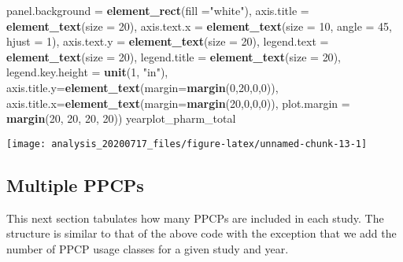 \documentclass[
]{article}
\newenvironment{Shaded}{\begin{snugshade}}{\end{snugshade}}
\newcommand{\DataTypeTok}[1]{\textcolor[rgb]{0.13,0.29,0.53}{#1}}
\newcommand{\DecValTok}[1]{\textcolor[rgb]{0.00,0.00,0.81}{#1}}
\newcommand{\KeywordTok}[1]{\textcolor[rgb]{0.13,0.29,0.53}{\textbf{#1}}}
\newcommand{\NormalTok}[1]{#1}
\newcommand{\StringTok}[1]{\textcolor[rgb]{0.31,0.60,0.02}{#1}}
\begin{document}
\begin{Shaded}
\begin{Highlighting}[]
        \DataTypeTok{panel.background =} \KeywordTok{element_rect}\NormalTok{(}\DataTypeTok{fill =}\StringTok{"white"}\NormalTok{),}
        \DataTypeTok{axis.title =} \KeywordTok{element_text}\NormalTok{(}\DataTypeTok{size =} \DecValTok{20}\NormalTok{),}
        \DataTypeTok{axis.text.x =} \KeywordTok{element_text}\NormalTok{(}\DataTypeTok{size =} \DecValTok{10}\NormalTok{, }\DataTypeTok{angle =} \DecValTok{45}\NormalTok{, }\DataTypeTok{hjust =} \DecValTok{1}\NormalTok{),}
        \DataTypeTok{axis.text.y =} \KeywordTok{element_text}\NormalTok{(}\DataTypeTok{size =} \DecValTok{20}\NormalTok{),}
        \DataTypeTok{legend.text =} \KeywordTok{element_text}\NormalTok{(}\DataTypeTok{size =} \DecValTok{20}\NormalTok{),}
        \DataTypeTok{legend.title =} \KeywordTok{element_text}\NormalTok{(}\DataTypeTok{size =} \DecValTok{20}\NormalTok{),}
        \DataTypeTok{legend.key.height =} \KeywordTok{unit}\NormalTok{(}\DecValTok{1}\NormalTok{, }\StringTok{"in"}\NormalTok{),}
        \DataTypeTok{axis.title.y=}\KeywordTok{element_text}\NormalTok{(}\DataTypeTok{margin=}\KeywordTok{margin}\NormalTok{(}\DecValTok{0}\NormalTok{,}\DecValTok{20}\NormalTok{,}\DecValTok{0}\NormalTok{,}\DecValTok{0}\NormalTok{)), }
        \DataTypeTok{axis.title.x=}\KeywordTok{element_text}\NormalTok{(}\DataTypeTok{margin=}\KeywordTok{margin}\NormalTok{(}\DecValTok{20}\NormalTok{,}\DecValTok{0}\NormalTok{,}\DecValTok{0}\NormalTok{,}\DecValTok{0}\NormalTok{)),}
        \DataTypeTok{plot.margin =} \KeywordTok{margin}\NormalTok{(}\DecValTok{20}\NormalTok{, }\DecValTok{20}\NormalTok{, }\DecValTok{20}\NormalTok{, }\DecValTok{20}\NormalTok{))}
\NormalTok{yearplot_pharm_total}
\end{Highlighting}
\end{Shaded}

\begin{center}\texttt{[image: analysis\_20200717\_files/figure-latex/unnamed-chunk-13-1]} \end{center}

\hypertarget{multiple-ppcps}{%
\subsection{Multiple PPCPs}\label{multiple-ppcps}}

This next section tabulates how many PPCPs are included in each study.
The structure is similar to that of the above code with the exception
that we add the number of PPCP usage classes for a given study and year.
\end{document}
